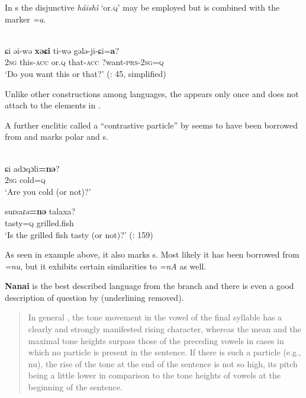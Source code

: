 In s the   disjunctive \textit{háishì}  ‘or.\textsc{q}’ may be employed but is combined with the marker \textit{=a}.

\ea%
    \label{ex:tungu:50}
    \\
    \gll ɕi  əi-wə \textbf{{xəɕi}} ti-wə    gələ-ji-ɕi=\textbf{{a}}?\\
    2\textsc{sg}  this-\textsc{acc}  or.\textsc{q}  that-\textsc{acc}  ?want-\textsc{prs}-2\textsc{sg}=\textsc{q}\\
    \glt ‘Do you want this or that?’ (\citealt{ZhangZhangDai1989}: 45, simplified)
    \z

Unlike other  constructions among  languages, the  appears only once and does not attach to the elements in .

A further enclitic called a “contrastive particle” by \citet[159]{ZhangPaiyu2013} seems to have been borrowed from  and marks polar and s.

\ea%
    \label{ex:tungu:51}
    \\
    \ea
    \gll ɕi adɔqɔli\textbf{{=nə}}? \\
    2\textsc{sg}    cold=\textsc{q}\\
    \glt ‘Are you cold (or not)?’
    
    \ex
    \gll suɾsaɾə\textbf{{=nə}} talaxa?\\
    tasty=\textsc{q}  grilled.fish\\
    \glt ‘Is the grilled fish tasty (or not)?’ (\citealt{ZhangPaiyu2013}: 159)
    \z
    \z

As seen in example  above, it also marks s. Most likely it has been borrowed from  \textit{=nu}, but it exhibits certain similarities to  \textit{=nA} as well.

\textbf{Nanai} is the best described language from the  branch and there is even a good description of question  by \citet[294]{Baitchura1979} (underlining removed).

\begin{quote}
In general , the tone movement in the vowel of the final syllable has a clearly and strongly manifested rising character, whereas the mean and the maximal tone heights surpass those of the preceding vowels in cases in which no  particle is present in the sentence. If there is such a particle (e.g., nu), the rise of the tone at the end of the sentence is not so high, its pitch being a little lower in comparison to the tone heights of vowels at the beginning of the sentence.
\end{quote}

